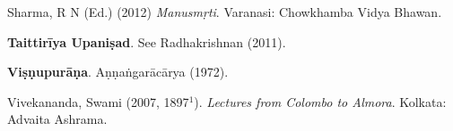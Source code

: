 \begin{thebibliography}{99}
Sharma, R N (Ed.) (2012)  {\sl Manusmṛti}. Varanasi: Chowkhamba Vidya Bhawan.

{\bf Taittirīya Upaniṣad}. See Radhakrishnan (2011).

{\bf Viṣṇupurāṇa}. Aṇṇaṅgarācārya (1972).

Vivekananda, Swami (2007, 1897$^1$). {\sl Lectures from Colombo to Almora}. Kolkata: Advaita Ashrama.
\end{thebibliography}


\theendnotes
\label{chapter\thechapter:end}

